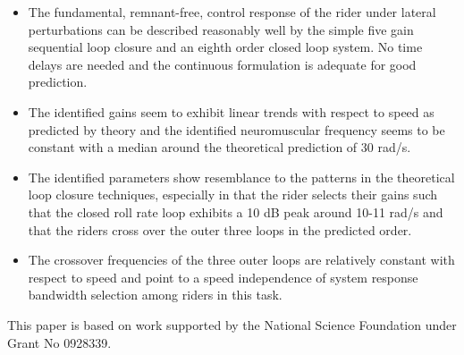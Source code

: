 \documentclass{article}
\begin{document}
\begin{itemize}
  \item The fundamental, remnant-free, control response of the rider under
    lateral perturbations can be described reasonably well by the simple five
    gain sequential loop closure and an eighth order closed loop system. No
    time delays are needed and the continuous formulation is adequate for good
    prediction.
  \item The identified gains seem to exhibit linear trends with respect to
    speed as predicted by theory and the identified neuromuscular frequency
    seems to be constant with a median around the theoretical prediction of 30
    rad/s.
  \item The identified parameters show resemblance to the patterns in the
    theoretical loop closure techniques, especially in that the rider selects
    their gains such that the closed roll rate loop exhibits a 10 dB peak
    around 10-11 rad/s and that the riders cross over the outer three loops in
    the predicted order.
  \item The crossover frequencies of the three outer loops are relatively
    constant with respect to speed and point to a speed independence of system
    response bandwidth selection among riders in this task.
\end{itemize}

This paper is based on work supported by the National Science Foundation under
Grant No 0928339.



\end{document}
